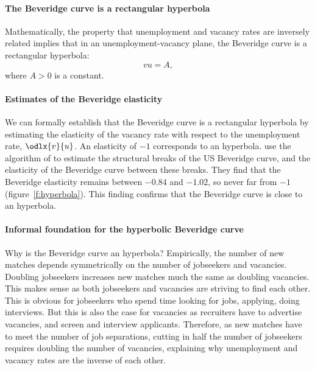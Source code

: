 \documentclass[letterpaper,12pt,leqno]{article}
\begin{document}
\paragraph{The Beveridge curve is a rectangular hyperbola} Mathematically, the property that unemployment and vacancy rates are inversely related implies that in an unemployment-vacancy plane, the Beveridge curve is a rectangular hyperbola:  
\begin{equation*}
vu = A,
\end{equation*}
where $A>0$ is a constant.

\paragraph{Estimates of the Beveridge elasticity} We can formally establish that the Beveridge curve is a rectangular hyperbola by estimating the elasticity of the vacancy rate with respect to the unemployment rate, $\odlx{v}{u}$. An elasticity of $-1$ corresponds to an hyperbola. \citet[figures 5 and 6]{MS16} use the algorithm of \citet{BP98,BP03} to estimate the structural breaks of the US Beveridge curve, and the elasticity of the Beveridge curve between these breaks. They find that the Beveridge elasticity remains between $-0.84$ and $-1.02$, so never far from $-1$ (figure~\ref{f:hyperbola}). This finding confirms that the Beveridge curve is close to an hyperbola.

\paragraph{Informal foundation for the hyperbolic Beveridge curve} Why is the Beveridge curve an hyperbola? Empirically, the number of new matches depends symmetrically on the number of jobseekers and vacancies. Doubling jobseekers increases new matches much the same as doubling vacancies. This makes sense as both jobseekers and vacancies are striving to find each other. This is obvious for jobseekers who spend time looking for jobs, applying, doing interviews. But this is also the case for vacancies as recruiters have to advertise vacancies, and screen and interview applicants. Therefore, as new matches have to meet the number of job separations, cutting in half the number of jobseekers requires doubling the number of vacancies, explaining why unemployment and vacancy rates are the inverse of each other.
\end{document}
